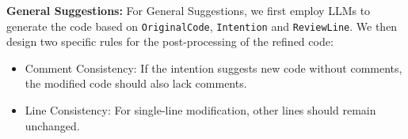 \noindent \textbf{General Suggestions:} For General Suggestions, we first employ LLMs to generate the code based on \texttt{OriginalCode}, \texttt{Intention} and \texttt{ReviewLine}. We then design two specific rules for the post-processing of the refined code:

\begin{itemize}[leftmargin=*,topsep=2pt]
    \item Comment Consistency: If the intention suggests new code without comments, the modified code should also lack comments.
    \item  Line Consistency: For single-line modification, other lines should remain unchanged.
\end{itemize}





